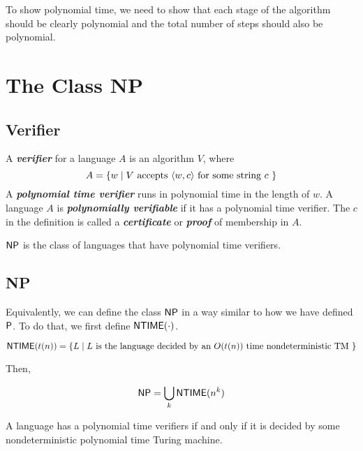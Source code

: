 To show polynomial time, we need to show that each stage of the algorithm should be clearly polynomial and the total number of steps should also be polynomial.

\section{The Class NP}

\subsection{Verifier}

\begin{definition}
    A \textit{\textbf{verifier}} for a language $A$ is an algorithm $V$, where
    $$
    A = \{ w \mid \text{$V$ accepts $\langle w,c \rangle$ for some string $c$ }\}
    $$
    A \textit{\textbf{polynomial time verifier}} runs in polynomial time in the length of $w$. A language $A$ is \textit{\textbf{polynomially verifiable}} if it has a polynomial time verifier. The $c$ in the definition is called a \textit{\textbf{certificate}} or \textit{\textbf{proof}} of membership in $A$.
\end{definition}

\begin{definition}
    $\mathsf{NP}$ is the class of languages that have polynomial time verifiers.
\end{definition}

\subsection{NP}

Equivalently, we can define the class $\mathsf{NP}$ in a way similar to how we have defined $\mathsf{P}$. To do that, we first define $\mathsf{NTIME}(\cdot)$.

\begin{definition}[NTIME]
    $$
    \mathsf{NTIME}(t(n)) = \{ L \mid \text{$L$ is the language decided by an $O(t(n))$ time nondeterministic TM }\}
    $$
\end{definition}

Then,

\begin{definition}[NP]
    $$
    \mathsf{NP} = \bigcup_k \mathsf{NTIME}(n^k)
    $$
\end{definition}

\begin{theorem}
    A language has a polynomial time verifiers if and only if it is decided by some nondeterministic polynomial time Turing machine.
\end{theorem}

